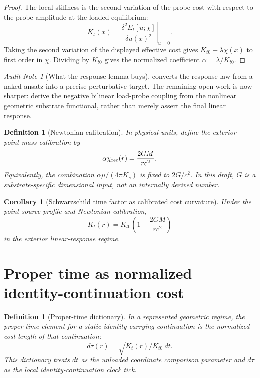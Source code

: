 \documentclass[11pt]{article}
\newtheorem{corollary}[theorem]{Corollary}
\newtheorem{definition}[theorem]{Definition}
\theoremstyle{remark}
\newtheorem{audit}[theorem]{Audit Note}
\begin{document}
\begin{proof}
The local stiffness is the second variation of the probe cost with respect to the probe amplitude at the loaded equilibrium:
\[
        K_t(x)=\left.\frac{\delta^2 E_t[u;\chi]}{\delta u(x)^2}\right|_{u=0}.
\]
Taking the second variation of the displayed effective cost gives \(K_{t0}-\lambda\chi(x)\) to first order in \(\chi\).  Dividing by \(K_{t0}\) gives the normalized coefficient \(\alpha=\lambda/K_{t0}\).
\end{proof}

\begin{audit}[What the response lemma buys]
 converts the response law from a naked ansatz into a precise perturbative target.  The remaining open work is now sharper: derive the negative bilinear load-probe coupling from the nonlinear geometric substrate functional, rather than merely assert the final linear response.
\end{audit}

\begin{definition}[Newtonian calibration]
In physical units, define the exterior point-mass calibration by
\[
        \alpha\chi_{\rm rec}(r)=\frac{2GM}{rc^2}.
\]
Equivalently, the combination \(\alpha\mu/(4\pi K_s)\) is fixed to \(2G/c^2\).  In this draft, \(G\) is a substrate-specific dimensional input, not an internally derived number.
\end{definition}

\begin{corollary}[Schwarzschild time factor as calibrated cost curvature]
\label{cor:schwarzschild-factor}
Under the point-source profile and Newtonian calibration,
\[
        K_t(r)=K_{t0}\left(1-\frac{2GM}{rc^2}\right)
\]
in the exterior linear-response regime.
\end{corollary}

\section{Proper time as normalized identity-continuation cost}

\begin{definition}[Proper-time dictionary]
In a represented geometric regime, the proper-time element for a static identity-carrying continuation is the normalized cost length of that continuation:
\[
        d\tau(r)=\sqrt{K_t(r)/K_{t0}}\,dt.
\]
This dictionary treats \(dt\) as the unloaded coordinate comparison parameter and \(d\tau\) as the local identity-continuation clock tick.
\end{definition}
\end{document}
